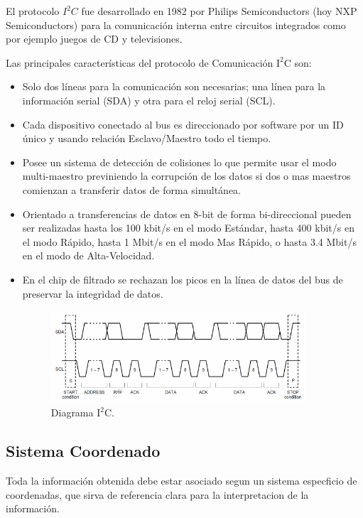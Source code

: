 \documentclass[12pt,a4paper]{article}
\begin{document}
			El protocolo $I^2C$ fue desarrollado en 1982 por Philips Semiconductors (hoy NXP Semiconductors) para la comunicación interna entre circuitos integrados como por ejemplo juegos de CD y televisiones.
			
			Las principales características del protocolo de Comunicación $\mathrm{I^2C}$ \cite{I2C} son:
			\begin{itemize}
				\item Solo dos líneas para la comunicación son necesarias; una línea para la información serial (SDA) y otra para el reloj serial (SCL).
				
				\item Cada dispositivo conectado al bus es direccionado por software por un ID único y usando relación Esclavo/Maestro todo el tiempo.
				
				\item Posee un sistema de detección de colisiones lo que permite usar el modo multi-maestro previniendo la corrupción de los datos si dos o mas maestros comienzan a transferir datos de forma simultánea.
				
				\item Orientado a transferencias de datos en 8-bit de forma bi-direccional pueden ser realizadas hasta los 100 kbit/s en el modo Estándar, hasta 400 kbit/s en el modo Rápido, hasta 1 Mbit/s en el modo Mas Rápido, o hasta 3.4 Mbit/s en el modo de Alta-Velocidad.
				
				\item En el chip de filtrado se rechazan los picos en la línea de datos del bus de preservar la integridad de datos.
				
				\begin{figure}[H]
					\centering
					\includegraphics[width=0.9\textwidth]{images/Diagrama_I2C}
					\caption{Diagrama $\mathrm{I^2C.}$}
					\label{fig:diagramaI2C}
				\end{figure}
			\end{itemize}
			
			\subsection{Sistema Coordenado}
			Toda la información obtenida debe estar asociado segun un sistema especficio de coordenadas, que sirva de referencia clara para la interpretacion de la información.
			
\end{document}
